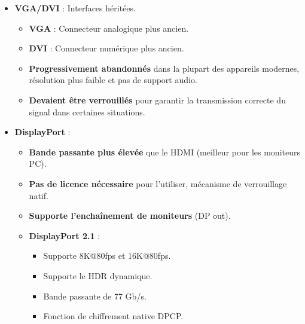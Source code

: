 \documentclass[10pt,a4paper]{article}
\begin{document}
\begin{itemize}
    \item \textbf{VGA/DVI} : Interfaces héritées.
    \begin{itemize}
        \item \textbf{VGA} : Connecteur analogique plus ancien.
        \item \textbf{DVI} : Connecteur numérique plus ancien.
        \item \textbf{Progressivement abandonnés} dans la plupart des appareils modernes, résolution plus faible et pas de support audio.
        \item \textbf{Devaient être verrouillés} pour garantir la transmission correcte du signal dans certaines situations.
    \end{itemize}
\end{itemize}

\begin{itemize}
    \item \textbf{DisplayPort} :
    \begin{itemize}
        \item \textbf{Bande passante plus élevée} que le HDMI (meilleur pour les moniteurs PC).
        \item \textbf{Pas de licence nécessaire} pour l'utiliser, mécanisme de verrouillage natif.
        \item \textbf{Supporte l'enchaînement de moniteurs} (DP out).
        \item \textbf{DisplayPort 2.1} :
        \begin{itemize}
            \item Supporte 8K@80fps et 16K@80fps.
            \item Supporte le HDR dynamique.
            \item Bande passante de 77 Gb/s.
            \item Fonction de chiffrement native DPCP.
        \end{itemize}
    \end{itemize}
\end{itemize}
\end{document}

